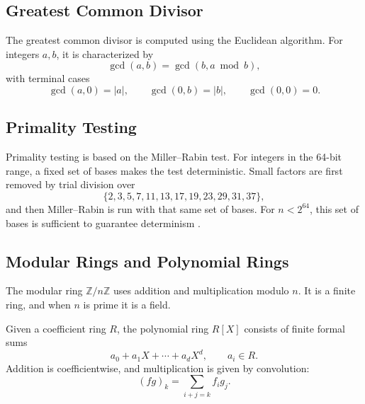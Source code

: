 \subsection*{Greatest Common Divisor}

The greatest common divisor is computed using the Euclidean algorithm. For
integers $a,b$, it is characterized by
\[
\gcd(a,b) = \gcd(b, a \bmod b),
\]
with terminal cases
\[
\gcd(a,0)=|a|,
\qquad
\gcd(0,b)=|b|,
\qquad
\gcd(0,0)=0.
\]

\subsection*{Primality Testing}

Primality testing is based on the Miller--Rabin test. For integers in the
64-bit range, a fixed set of bases makes the test deterministic. Small factors
are first removed by trial division over
\[
\{2,3,5,7,11,13,17,19,23,29,31,37\},
\]
and then Miller--Rabin is run with that same set of bases. For
$n < 2^{64}$, this set of bases is sufficient to guarantee determinism
\cite{jaeschke1993miller, sorenson2015strong}.

\subsection*{Modular Rings and Polynomial Rings}

The modular ring $\mathbb{Z}/n\mathbb{Z}$ uses addition and multiplication
modulo $n$. It is a finite ring, and when $n$ is prime it is a field.

Given a coefficient ring $R$, the polynomial ring $R[X]$ consists of finite
formal sums
\[
a_0 + a_1X + \cdots + a_dX^d,
\qquad a_i \in R.
\]
Addition is coefficientwise, and multiplication is given by convolution:
\[
(fg)_k = \sum_{i+j=k} f_i g_j.
\]
